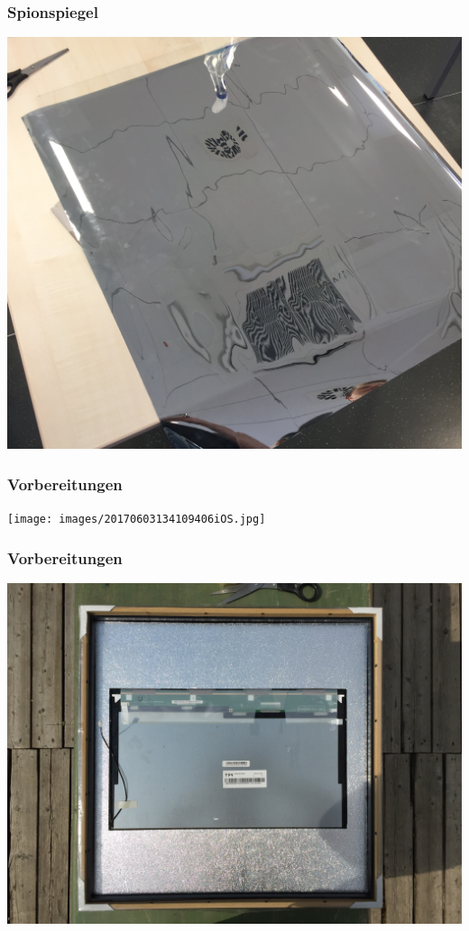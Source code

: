 \documentclass[11pt]{beamer}
\begin{document}
	\begin{frame}
		\frametitle{Spionspiegel}
		\begin{center}
			\includegraphics[scale=.09]{images/Spionspiegel.jpg}
		\end{center}
	\end{frame}
	
	\begin{frame}
		\frametitle{Vorbereitungen}
		\begin{center}
			\texttt{[image: images/20170603134109406iOS.jpg]}
		\end{center}
	\end{frame}
	
	\begin{frame}
		\frametitle{Vorbereitungen}
		\begin{center}
			\includegraphics[scale=0.07]{images/20170603135112066iOS.jpg}
		\end{center}
	\end{frame}
	
\end{document}
